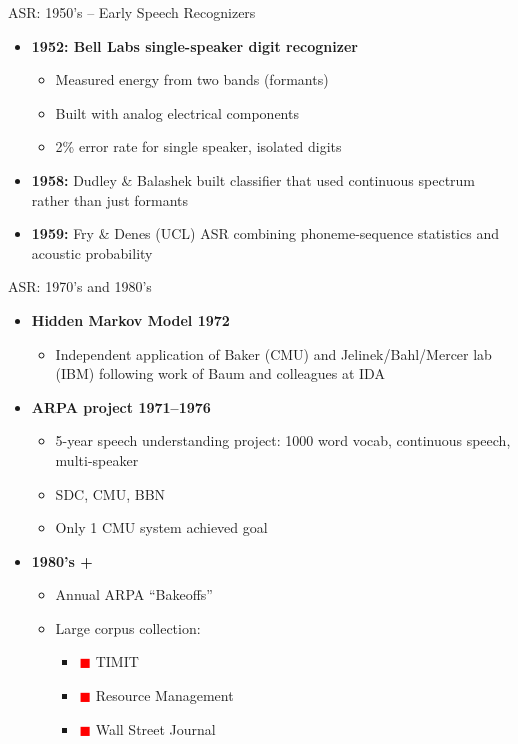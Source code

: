 \begin{frame}{ASR: 1950's -- Early Speech Recognizers}
  \begin{itemize}
    \item \textbf{1952: Bell Labs single-speaker digit recognizer}
    \begin{itemize}
      \item Measured energy from two bands (formants)
      \item Built with analog electrical components
      \item 2\% error rate for single speaker, isolated digits
    \end{itemize}
    \item \textbf{1958:} Dudley \& Balashek built classifier that used continuous spectrum rather than just formants
    \item \textbf{1959:} Fry \& Denes (UCL) ASR combining phoneme-sequence statistics and acoustic probability
  \end{itemize}
\end{frame}

\begin{frame}{ASR: 1970's and 1980's}
  \begin{itemize}
    \item \textbf{Hidden Markov Model 1972}
    \begin{itemize}
      \item Independent application of Baker (CMU) and Jelinek/Bahl/Mercer lab (IBM) following work of Baum and colleagues at IDA
    \end{itemize}
    \item \textbf{ARPA project 1971--1976}
    \begin{itemize}
      \item 5-year speech understanding project: 1000 word vocab, continuous speech, multi-speaker
      \item SDC, CMU, BBN
      \item Only 1 CMU system achieved goal
    \end{itemize}
    \item \textbf{1980's +}
    \begin{itemize}
      \item Annual ARPA ``Bakeoffs''
      \item Large corpus collection:
      \begin{itemize}
        \item[] \textcolor{red}{$\blacksquare$} TIMIT
        \item[] \textcolor{red}{$\blacksquare$} Resource Management
        \item[] \textcolor{red}{$\blacksquare$} Wall Street Journal
      \end{itemize}
    \end{itemize}
  \end{itemize}
\end{frame}

